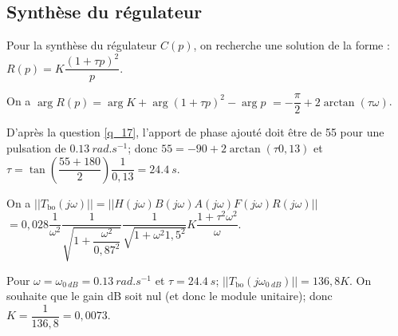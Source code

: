 \else
\fi

\subsection{\label{sec:3:C} Synthèse du régulateur}

Pour la synthèse du régulateur $C(p)$, on recherche une solution de la forme : $R(p)=K \dfrac{\left(1+\tau p\right)^2}{p}$.

\ifprof
\begin{corrige}
On a $\arg{R(p)} = \arg{K}+ \arg{\left(1+\tau p\right)^2} - \arg{p}$
$ =-\dfrac{\pi}{2}  +2 \arctan\left(\tau \omega \right)$.

D'après la question \ref{q_17}, l'apport de phase ajouté doit être de \SI{55}{\degres} pour une pulsation de $ \SI{0,13}{rad.s^{-1}}$; donc $55=-90  +2 \arctan\left(\tau 0,13 \right) $ et $\tau = \tan \left(\dfrac{55+180}{2}\right) \dfrac{1}{0,13} = \SI{24,4}{s}$.
\end{corrige}
\else
\fi 



\ifprof
\begin{corrige}
On a $||T_{\text{bo}}(j\omega)||=||H(j\omega)B(j\omega)A(j\omega)F(j\omega)R(j\omega)||$
$=0,028 \dfrac{1}{\omega^2}\dfrac{1}{\sqrt{1+\dfrac{\omega^2}{0,87^2}}}\dfrac{1}{\sqrt{1+\omega^2 1,5^2}} K \dfrac{1+\tau^2\omega^2}{\omega}$.

Pour $\omega = \omega_{\SI{0}{dB}}=\SI{0,13}{rad.s^{-1}}$ et $\tau=\SI{24,4}{s}$; 
$||T_{\text{bo}}(j\omega_{\SI{0}{dB}})|| = 136,8 K$. On souhaite que le gain dB soit nul (et donc le module unitaire); donc $K= \dfrac{1}{136,8} = 0,0073$.
\end{corrige}
\else
\fi

